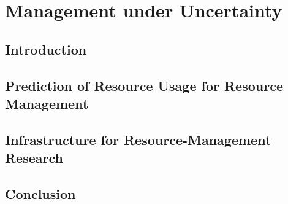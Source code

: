 \chapter{Management under Uncertainty}

\section{Introduction}

\section{Prediction of Resource Usage for Resource Management}

\section{Infrastructure for Resource-Management Research}

\section{Conclusion}
